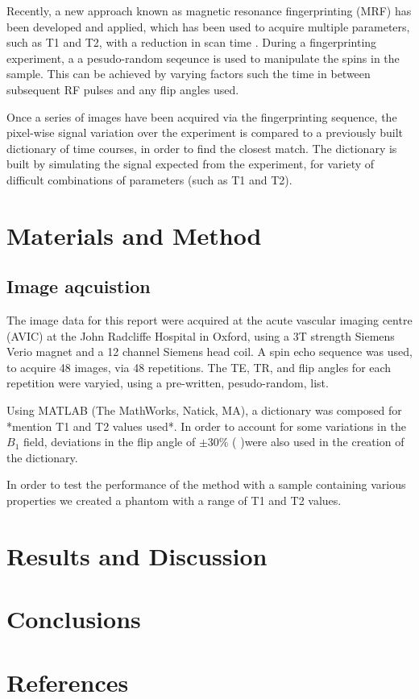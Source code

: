 \documentclass[review]{elsarticle}
\begin{document}
Recently, a new approach known as magnetic resonance fingerprinting (MRF) has been developed and applied, which has been used to acquire multiple parameters, such as T1 and T2, with a reduction in scan time \cite{ma2013magnetic} . During a fingerprinting experiment, a a pesudo-random seqeunce is used to manipulate the spins in the sample. This can be achieved by varying factors such the time in between subsequent RF pulses and any flip angles used.

Once a series of images have been acquired via the fingerprinting sequence, the pixel-wise signal variation over the experiment is compared to a previously built dictionary of time courses, in order to find the closest match. The dictionary is built by simulating the signal expected from the experiment, for variety of difficult combinations of parameters (such as T1 and T2). 


\section{Materials and Method}

\subsection{Image aqcuistion}
The image data for this report were acquired at the acute vascular imaging centre (AVIC) at the John Radcliffe Hospital in Oxford, using a 3T strength Siemens Verio magnet and a 12 channel Siemens head coil. A spin echo sequence was used, to acquire 48 images, via  48 repetitions. The TE, TR, and flip angles for each repetition were varyied, using a pre-written, pesudo-random, list.

Using MATLAB (The
MathWorks, Natick, MA), a dictionary was composed for *mention T1 and T2 values used*. In order to account for some variations in the $B_1$ field,  deviations in the flip angle of $\pm$30\% (%
)were also used in the creation of the dictionary.

In order to test the performance of the method with a sample containing various properties we created a phantom with a range of T1 and T2 values. %

\section{Results and Discussion}

\section{Conclusions}

\section*{References}


\end{document}
